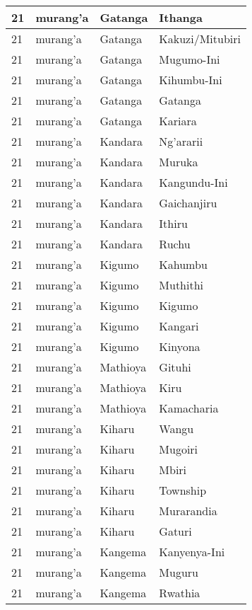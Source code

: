 \begin{table}[!ht]
\begin{tabular}{|l|l|l|l|}
        21 & murang’a & Gatanga & Ithanga \\ \hline
        21 & murang’a & Gatanga & Kakuzi/Mitubiri \\ \hline
        21 & murang’a & Gatanga & Mugumo-Ini \\ \hline
        21 & murang’a & Gatanga & Kihumbu-Ini \\ \hline
        21 & murang’a & Gatanga & Gatanga \\ \hline
        21 & murang’a & Gatanga & Kariara \\ \hline
        21 & murang’a & Kandara & Ng’ararii \\ \hline
        21 & murang’a & Kandara & Muruka \\ \hline
        21 & murang’a & Kandara & Kangundu-Ini \\ \hline
        21 & murang’a & Kandara & Gaichanjiru \\ \hline
        21 & murang’a & Kandara & Ithiru \\ \hline
        21 & murang’a & Kandara & Ruchu \\ \hline
        21 & murang’a & Kigumo & Kahumbu \\ \hline
        21 & murang’a & Kigumo & Muthithi \\ \hline
        21 & murang’a & Kigumo & Kigumo \\ \hline
        21 & murang’a & Kigumo & Kangari \\ \hline
        21 & murang’a & Kigumo & Kinyona \\ \hline
        21 & murang’a & Mathioya & Gituhi \\ \hline
        21 & murang’a & Mathioya & Kiru \\ \hline
        21 & murang’a & Mathioya & Kamacharia \\ \hline
        21 & murang’a & Kiharu & Wangu \\ \hline
        21 & murang’a & Kiharu & Mugoiri \\ \hline
        21 & murang’a & Kiharu & Mbiri \\ \hline
        21 & murang’a & Kiharu & Township \\ \hline
        21 & murang’a & Kiharu & Murarandia \\ \hline
        21 & murang’a & Kiharu & Gaturi \\ \hline
        21 & murang’a & Kangema & Kanyenya-Ini \\ \hline
        21 & murang’a & Kangema & Muguru \\ \hline
        21 & murang’a & Kangema & Rwathia \\ \hline

\end{tabular}
\end{table}

